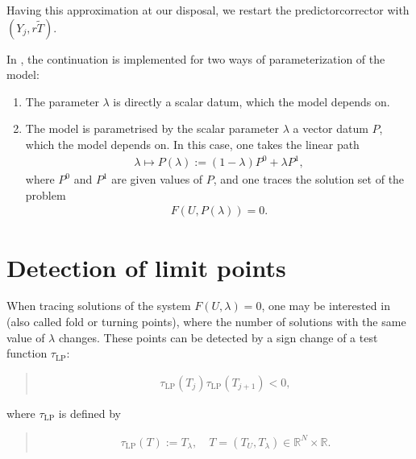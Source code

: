 \documentclass[a4paper,11pt,english]{sphinxmanual}
\begin{document}
Having this approximation at our disposal, we restart the predictor\sphinxhyphen{}corrector
with \((Y_{j}, r \tilde{T})\).

In , the continuation is implemented for two ways of parameterization of the
model:
\begin{enumerate}
%
\item {} 
The parameter \(\lambda\) is directly a scalar datum, which the model
depends on.

\item {} 
The model is parametrised by the scalar parameter \(\lambda\)  a
vector datum \(P\), which the model depends on. In this case, one takes
the linear path
\begin{equation*}
\begin{split}\lambda \mapsto P(\lambda) := (1 - \lambda)P^{0} + \lambda P^{1},\end{split}
\end{equation*}
where \(P^{0}\) and \(P^{1}\) are given values of \(P\), and one
traces the solution set of the problem
\begin{equation*}
\begin{split}F(U, P(\lambda)) = 0.\end{split}
\end{equation*}
\end{enumerate}


\section{Detection of limit points}
\label{\detokenize{userdoc/model_continuation:detection-of-limit-points}}
When tracing solutions of the system \(F(U,\lambda) = 0\), one may be
interested in  (also called fold or turning points), where the
number of solutions with the same value of \(\lambda\) changes. These points
can be detected by a sign change of a test function \(\tau_{\mathrm{LP}}\):
\begin{quote}
\begin{equation*}
\begin{split}\tau_{\mathrm{LP}}(T_{j}) \tau_{\mathrm{LP}}(T_{j+1}) < 0,\end{split}
\end{equation*}\end{quote}

where \(\tau_{\mathrm{LP}}\) is defined by
\begin{quote}
\begin{equation*}
\begin{split}\tau_{\mathrm{LP}}(T) := T_{\lambda},\quad T = (T_{U},T_{\lambda}) \in \mathbb{R}^{N} \times \mathbb{R}.\end{split}
\end{equation*}\end{quote}
\end{document}
